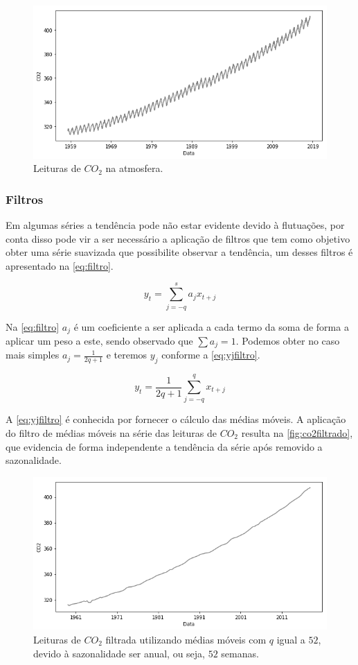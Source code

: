\documentclass[
    12pt,
    oneside,
    a4paper,
    english,
    brazil
]{abntex2}
\begin{document}
\begin{figure}
    \centering
    \caption{Leituras de $CO_2$ na atmosfera.}\label{fig:co2}
    \includegraphics[width=.6\linewidth]{images/co2.png}
\end{figure}

\subsubsection{Filtros}

Em algumas séries a tendência pode não estar evidente devido à flutuações, por
conta disso pode vir a ser necessário a aplicação de filtros que tem como
objetivo obter uma série suavizada que possibilite observar a tendência, um
desses filtros é apresentado na \autoref{eq:filtro}\cite{ehlers}.

\begin{equation}
    \label{eq:filtro}
    y_t = \sum_{j = -q}^{s}{a_{j}x_{t+j}}
\end{equation}

Na \autoref{eq:filtro} $a_j$ é um coeficiente a ser aplicada a cada termo da
soma de forma a aplicar um peso a este, sendo observado que $\sum{a_j} = 1$.
Podemos obter no caso mais simples $a_j = \frac{1}{2q + 1}$ e teremos $y_j$
conforme a \autoref{eq:yjfiltro}.

\begin{equation}
    \label{eq:yjfiltro}
    y_t = \frac{1}{2q + 1}\sum_{j=-q}^{q}{x_{t+j}}
\end{equation}

A \autoref{eq:yjfiltro} é conhecida por fornecer o cálculo das médias móveis. A
aplicação do filtro de médias móveis na série das leituras de $CO_2$ resulta na
\autoref{fig:co2filtrado}, que evidencia de forma independente a tendência da
série após removido a sazonalidade.

\begin{figure}
    \centering
    \caption{Leituras de $CO_2$ filtrada utilizando médias móveis com $q$ igual
        a $52$, devido à sazonalidade ser anual, ou seja, $52$
        semanas.}\label{fig:co2filtrado}
    \includegraphics[width=.6\linewidth]{images/co2_filtered.png}
\end{figure}
\end{document}
